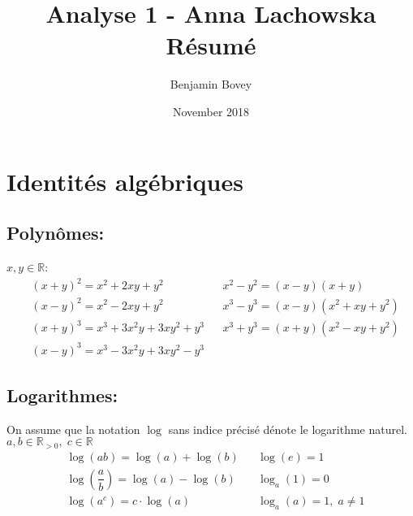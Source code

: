 \documentclass{article}
\title{\vspace{-2cm}Analyse 1 - Anna Lachowska\\Résumé}
\author{Benjamin Bovey}
\date{November 2018}
\numberwithin{equation}{section}
\begin{document}
\maketitle

\section{Identités algébriques}
\subsection{Polynômes:} 
\(x,y \in \mathbb{R}\):
\begin{align*}
	&(x+y)^2 = x^2 + 2xy + y^2 				& 	&x^2 - y^2 = (x - y)(x + y) \\
	&(x-y)^2 = x^2 - 2xy + y^2 					& 	&x^3 - y^3 = (x - y)(x^2 + xy + y^2) \\
	&(x+y)^3 = x^3 + 3x^2y + 3xy^2 + y^3 	& 	&x^3 + y^3 = (x + y)(x^2 - xy + y^2) \\
	&(x-y)^3 = x^3 - 3x^2y + 3xy^2 - y^3 
\end{align*}

\subsection{Logarithmes:}
On assume que la notation \(\log\) sans indice précisé dénote le logarithme naturel. \\
\(a, b \in \mathbb{R}_{>0}, \; c \in \mathbb{R}\)
\begin{align*}
	&\log(ab) 							= \log(a) + \log(b) 		&	&\log(e)		= 1 \\
	&\log{\left (\dfrac{a}{b}\right )} 	= \log (a) - \log (b) 	&	&\log_a(1)	= 0 \\
	&\log(a^c) 							= c \cdot \log(a) 		&	&\log_a(a)	= 1, \; a \neq 1 \\
\end{align*}
\end{document}
